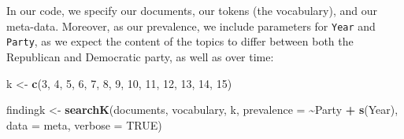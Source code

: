 \documentclass[
]{book}
\newenvironment{Shaded}{\begin{snugshade}}{\end{snugshade}}
\newcommand{\AttributeTok}[1]{\textcolor[rgb]{0.13,0.29,0.53}{#1}}
\newcommand{\ConstantTok}[1]{\textcolor[rgb]{0.56,0.35,0.01}{#1}}
\newcommand{\DecValTok}[1]{\textcolor[rgb]{0.00,0.00,0.81}{#1}}
\newcommand{\FunctionTok}[1]{\textcolor[rgb]{0.13,0.29,0.53}{\textbf{#1}}}
\newcommand{\NormalTok}[1]{#1}
\newcommand{\OtherTok}[1]{\textcolor[rgb]{0.56,0.35,0.01}{#1}}
\newcommand{\SpecialCharTok}[1]{\textcolor[rgb]{0.81,0.36,0.00}{\textbf{#1}}}
\begin{document}
In our code, we specify our documents, our tokens (the vocabulary), and our meta-data. Moreover, as our prevalence, we include parameters for \texttt{Year} and \texttt{Party}, as we expect the content of the topics to differ between both the Republican and Democratic party, as well as over time:

\begin{Shaded}
\begin{Highlighting}[]
\NormalTok{k }\OtherTok{\textless{}{-}} \FunctionTok{c}\NormalTok{(}\DecValTok{3}\NormalTok{, }\DecValTok{4}\NormalTok{, }\DecValTok{5}\NormalTok{, }\DecValTok{6}\NormalTok{, }\DecValTok{7}\NormalTok{, }\DecValTok{8}\NormalTok{, }\DecValTok{9}\NormalTok{, }\DecValTok{10}\NormalTok{, }\DecValTok{11}\NormalTok{, }\DecValTok{12}\NormalTok{, }\DecValTok{13}\NormalTok{, }\DecValTok{14}\NormalTok{, }\DecValTok{15}\NormalTok{)}
\end{Highlighting}
\end{Shaded}

\begin{Shaded}
\begin{Highlighting}[]
\NormalTok{findingk }\OtherTok{\textless{}{-}} \FunctionTok{searchK}\NormalTok{(documents, vocabulary, k, }\AttributeTok{prevalence =} \SpecialCharTok{\textasciitilde{}}\NormalTok{Party }\SpecialCharTok{+} \FunctionTok{s}\NormalTok{(Year), }\AttributeTok{data =}\NormalTok{ meta,}
    \AttributeTok{verbose =} \ConstantTok{TRUE}\NormalTok{)}
\end{Highlighting}
\end{Shaded}

\begin{Shaded}
\end{Shaded}
\end{document}
